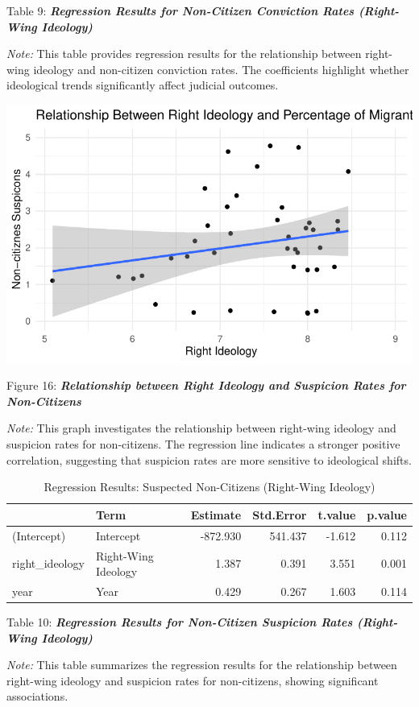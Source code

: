 \documentclass[
]{article}
\begin{document}
Table 9: \textbf{\emph{Regression Results for Non-Citizen Conviction
Rates (Right-Wing Ideology)}}

\emph{Note:} This table provides regression results for the relationship
between right-wing ideology and non-citizen conviction rates. The
coefficients highlight whether ideological trends significantly affect
judicial outcomes.

\includegraphics{DataMan_Project_files/figure-pdf/unnamed-chunk-50-1.pdf}

Figure 16: \textbf{\emph{Relationship between Right Ideology and
Suspicion Rates for Non-Citizens}}

\emph{Note:} This graph investigates the relationship between right-wing
ideology and suspicion rates for non-citizens. The regression line
indicates a stronger positive correlation, suggesting that suspicion
rates are more sensitive to ideological shifts.

\begin{table}
\centering
\caption{Regression Results: Suspected Non-Citizens (Right-Wing Ideology)}
\centering
\begin{tabular}[t]{l|l|r|r|r|r}
\hline
  & Term & Estimate & Std.Error & t.value & p.value\\
\hline
(Intercept) & Intercept & -872.930 & 541.437 & -1.612 & 0.112\\
\hline
right\_ideology & Right-Wing Ideology & 1.387 & 0.391 & 3.551 & 0.001\\
\hline
year & Year & 0.429 & 0.267 & 1.603 & 0.114\\
\hline
\end{tabular}
\end{table}

Table 10: \textbf{\emph{Regression Results for Non-Citizen Suspicion
Rates (Right-Wing Ideology)}}

\emph{Note:} This table summarizes the regression results for the
relationship between right-wing ideology and suspicion rates for
non-citizens, showing significant associations.
\end{document}
